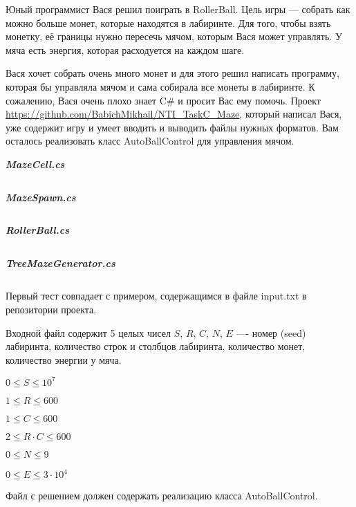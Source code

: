 
Юный программист Вася решил поиграть в RollerBall. Цель игры — собрать как можно больше монет, которые находятся в лабиринте. Для того, чтобы взять монетку, её границы нужно пересечь мячом, которым Вася может управлять. У мяча есть энергия, которая расходуется на каждом шаге.

Вася хочет собрать очень много монет и для этого решил написать программу, которая бы управляла мячом и сама собирала все монеты в лабиринте. К сожалению, Вася очень плохо знает C\# и просит Вас ему помочь. Проект \url{https://github.com/BabichMikhail/NTI_TaskC_Maze}, который написал Вася, уже содержит игру и умеет вводить и выводить файлы нужных форматов. Вам осталось реализовать класс AutoBallControl для управления мячом.

\textit{\textbf{MazeCell.cs}}

\inputminted[fontsize=\footnotesize, linenos]{csharp}{2nd_tour/vr/task_03/source_1.cs}

\textit{\textbf{MazeSpawn.cs}}

\inputminted[fontsize=\footnotesize, linenos]{csharp}{2nd_tour/vr/task_03/source_2.cs}

\textit{\textbf{RollerBall.cs}}

\inputminted[fontsize=\footnotesize, linenos]{csharp}{2nd_tour/vr/task_03/source_3.cs}

\textit{\textbf{TreeMazeGenerator.cs}}

\inputminted[fontsize=\footnotesize, linenos]{csharp}{2nd_tour/vr/task_03/source_4.cs}

Первый тест совпадает с примером, содержащимся в файле input.txt в репозитории проекта.


Входной файл содержит 5 целых чисел $S$, $R$, $C$, $N$, $E$ —- номер (seed) лабиринта, количество строк и столбцов лабиринта, количество монет, количество энергии у мяча.

$0\leq S \leq 10^7$

$1\leq R \leq 600$

$1\leq C \leq 600$

$2\leq R\cdot C \leq 600$

$0\leq N \leq 9$

$0\leq E \leq 3\cdot 10^4$

\outputfmtSection

Файл с решением должен содержать реализацию класса AutoBallControl.

